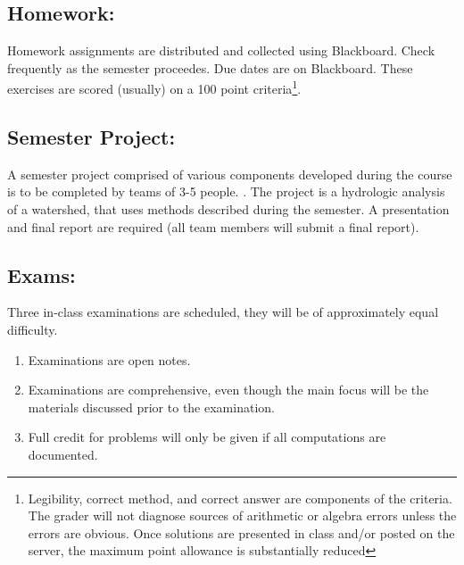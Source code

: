 \documentclass[12pt]{article}
\begin{document}
\subsection*{Homework:} 
Homework assignments are distributed and collected using Blackboard.  Check frequently as the semester proceedes.  Due dates are on Blackboard.  
These exercises are scored (usually) on a 100 point criteria\footnote{Legibility, correct method, and correct answer are components of the criteria.   
The grader will not diagnose sources of arithmetic or algebra errors unless the errors are obvious.  
Once solutions are presented in class and/or posted on the server, the maximum point allowance is substantially reduced}.

\subsection*{Semester Project:}  
A semester project comprised of various components developed during the course is to be completed by teams of 3-5 people.  .  
The project is a hydrologic analysis of a watershed, that uses methods described during the semester. 
A presentation and final report are required (all team members will submit a final report).

\subsection*{Exams:} Three in-class examinations are scheduled, they will be of approximately equal difficulty.  
\begin{enumerate}
\item Examinations are open notes.
\item Examinations are comprehensive, even though the main focus will be the materials discussed prior to the examination.
\item Full credit for problems will only be given if all computations are documented.
\end{enumerate}
\end{document}
